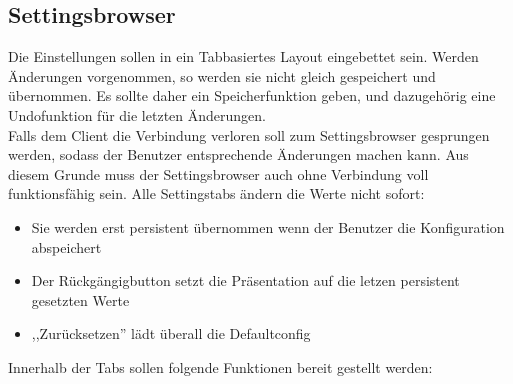 
\subsection{Settingsbrowser}
Die Einstellungen sollen in ein Tabbasiertes Layout eingebettet sein. 
Werden Änderungen vorgenommen, so werden sie nicht gleich gespeichert und übernommen. 
Es sollte daher ein Speicherfunktion geben, und dazugehörig eine Undofunktion für die letzten Änderungen.
\\
Falls dem Client die Verbindung verloren soll zum Settingsbrowser gesprungen werden, sodass der Benutzer entsprechende
Änderungen machen kann. Aus diesem Grunde muss der Settingsbrowser auch ohne Verbindung voll funktionsfähig sein.
Alle Settingstabs ändern die Werte nicht sofort:
\begin{itemize} 
    \item Sie werden erst persistent übernommen wenn der Benutzer die Konfiguration abspeichert
    \item Der Rückgängigbutton setzt die Präsentation auf die letzen persistent gesetzten Werte
    \item ,,Zurücksetzen'' lädt überall die Defaultconfig
\end{itemize}
Innerhalb der Tabs sollen folgende Funktionen bereit gestellt werden:
